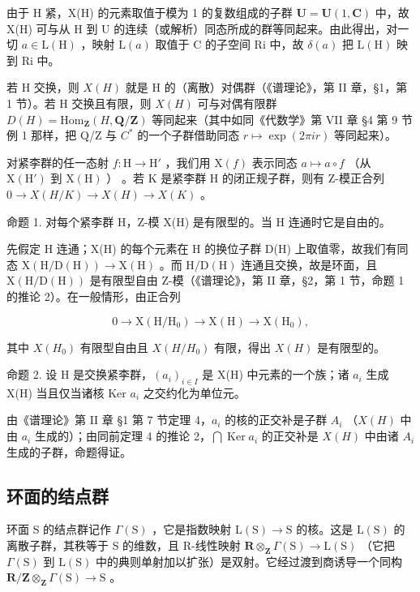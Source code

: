 由于 H 紧，X(H) 的元素取值于模为 1 的复数组成的子群 \(\mathbf{U} = \mathbf{U}(1, \mathbf{C})\) 中，故 X(H) 可与从 H 到 U 的连续（或解析）同态所成的群等同起来。由此得出，对一切 \(a \in \mathrm{L}(\mathrm{H})\) ，映射 \(\mathrm{L}(a)\) 取值于 C 的子空间 Ri 中，故 \(\delta(a)\) 把 \(\mathrm{L}(\mathrm{H})\) 映到 Ri 中。

若 H 交换，则 \(X(H)\) 就是 H 的（离散）对偶群（《谱理论》，第 II 章，§1，第 1 节）。若 H 交换且有限，则 \(X(H)\) 可与对偶有限群 \(D(H) = \text{Hom}_{\mathbf{Z}}(H, \mathbf{Q}/\mathbf{Z})\) 等同起来（其中如同《代数学》第 VII 章 §4 第 9 节例 1 那样，把 Q/Z 与 \(C^{*}\) 的一个子群借助同态 \(r \mapsto \exp(2\pi ir)\) 等同起来）。

对紧李群的任一态射 \(f: \mathrm{H} \to \mathrm{H}'\) ，我们用 \(\mathrm{X}(f)\) 表示同态 \(a \mapsto a \circ f\) （从 \(\mathrm{X}(\mathrm{H}')\) 到 \(\mathrm{X}(\mathrm{H})\) ） 。若 \(\mathrm{K}\) 是紧李群 H 的闭正规子群，则有 Z-模正合列 \(0 \rightarrow X(H/K) \rightarrow X(H) \rightarrow X(K)\) 。

命题 1. 对每个紧李群 H，Z-模 X(H) 是有限型的。当 H 连通时它是自由的。

先假定 H 连通；X(H) 的每个元素在 H 的换位子群 D(H) 上取值零，故我们有同态 \(\mathrm{X}(\mathrm{H}/\mathrm{D}(\mathrm{H}))\to\mathrm{X}(\mathrm{H})\) 。而 \(\mathrm{H}/\mathrm{D}(\mathrm{H})\) 连通且交换，故是环面，且 \(\mathrm{X}(\mathrm{H}/\mathrm{D}(\mathrm{H}))\) 是有限型自由 Z-模（《谱理论》，第 II 章，§2，第 1 节，命题 1 的推论 2）。在一般情形，由正合列

\[
0 \to \mathrm{X} (\mathrm{H} / \mathrm{H} _ {0}) \to \mathrm{X} (\mathrm{H}) \to \mathrm{X} (\mathrm{H} _ {0}),
\]

其中 \(X(H_{0})\) 有限型自由且 \(X(H/H_{0})\) 有限，得出 \(X(H)\) 是有限型的。

命题 2. 设 H 是交换紧李群，\((a_{i})_{i\in I}\) 是 X(H) 中元素的一个族；诸 \(a_{i}\) 生成 X(H) 当且仅当诸核 Ker \(a_{i}\) 之交约化为单位元。

由《谱理论》第 II 章 §1 第 7 节定理 4，\(a_i\) 的核的正交补是子群 \(A_i\) （\(X(H)\) 中由 \(a_i\) 生成的）；由同前定理 4 的推论 2，\(\bigcap \operatorname{Ker} a_i\) 的正交补是 \(X(H)\) 中由诸 \(A_i\) 生成的子群，命题得证。

\subsection{环面的结点群}

环面 S 的结点群记作 \(\Gamma(\mathrm{S})\) ，它是指数映射 \(\mathrm{L}(\mathrm{S}) \to \mathrm{S}\) 的核。这是 \(\mathrm{L}(\mathrm{S})\) 的离散子群，其秩等于 S 的维数，且 R-线性映射 \(\mathbf{R} \otimes_{\mathbf{Z}} \Gamma(\mathrm{S}) \to \mathrm{L}(\mathrm{S})\) （它把 \(\Gamma(\mathrm{S})\) 到 \(\mathrm{L}(\mathrm{S})\) 中的典则单射加以扩张）是双射。它经过渡到商诱导一个同构 \(\mathbf{R}/\mathbf{Z} \otimes_{\mathbf{Z}} \Gamma(\mathrm{S}) \to \mathrm{S}\) 。

